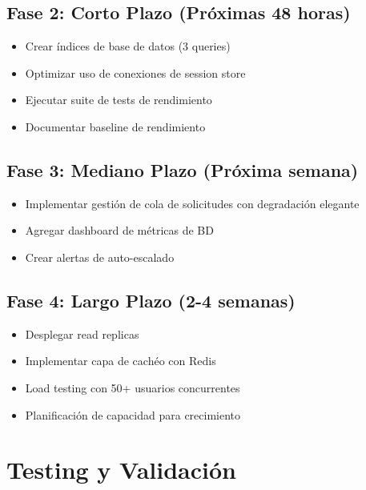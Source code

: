 \documentclass[12pt,a4paper]{article}
\begin{document}
\subsection{Fase 2: Corto Plazo (Próximas 48 horas)}

\begin{itemize}
    \item[$\square$] Crear índices de base de datos (3 queries)
    \item[$\square$] Optimizar uso de conexiones de session store
    \item[$\square$] Ejecutar suite de tests de rendimiento
    \item[$\square$] Documentar baseline de rendimiento
\end{itemize}

\subsection{Fase 3: Mediano Plazo (Próxima semana)}

\begin{itemize}
    \item[$\square$] Implementar gestión de cola de solicitudes con degradación elegante
    \item[$\square$] Agregar dashboard de métricas de BD
    \item[$\square$] Crear alertas de auto-escalado
\end{itemize}

\subsection{Fase 4: Largo Plazo (2-4 semanas)}

\begin{itemize}
    \item[$\square$] Desplegar read replicas
    \item[$\square$] Implementar capa de cachéo con Redis
    \item[$\square$] Load testing con 50+ usuarios concurrentes
    \item[$\square$] Planificación de capacidad para crecimiento
\end{itemize}

\newpage

\section{Testing y Validación}
\end{document}
